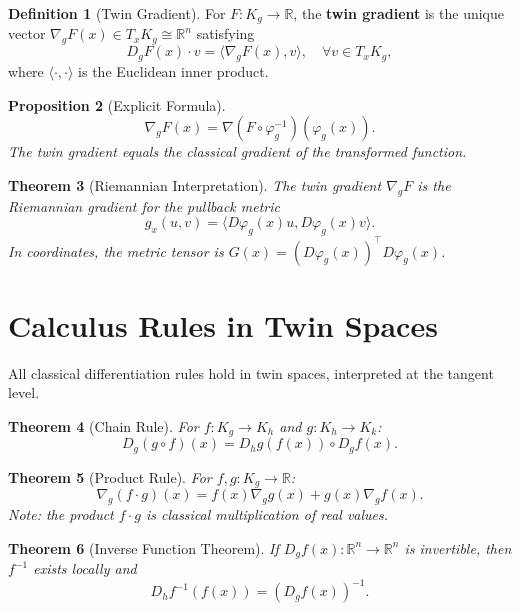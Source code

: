 \documentclass[11pt,twoside]{book}
\theoremstyle{plain}
\newtheorem{theorem}{Theorem}[chapter]
\newtheorem{proposition}[theorem]{Proposition}
\theoremstyle{definition}
\newtheorem{definition}[theorem]{Definition}
\theoremstyle{remark}
\newcommand{\R}{\mathbb{R}}
\newcommand{\Kg}{K_g}
\newcommand{\Dg}{D_g}
\newcommand{\nablg}{\nabla_g}
\begin{document}
\begin{definition}[Twin Gradient]
    \label{def:twin_gradient}
    For $F : \Kg \to \R$, the \textbf{twin gradient} is the unique vector $\nablg F(x) \in T_x \Kg \cong \R^n$ satisfying
    \[
    \Dg F(x) \cdot v = \langle \nablg F(x), v \rangle, \quad \forall v \in T_x \Kg,
    \]
    where $\langle \cdot, \cdot \rangle$ is the Euclidean inner product.
\end{definition}

\begin{proposition}[Explicit Formula]
    \label{prop:twin_grad_formula}
    \[
    \nablg F(x) = \nabla(F \circ \varphi_g^{-1})(\varphi_g(x)).
    \]
    The twin gradient equals the classical gradient of the transformed function.
\end{proposition}

\begin{theorem}[Riemannian Interpretation]
    \label{thm:riemannian}
    The twin gradient $\nablg F$ is the Riemannian gradient for the pullback metric
    \[
    g_x(u, v) = \langle D\varphi_g(x) u, D\varphi_g(x) v \rangle.
    \]
    In coordinates, the metric tensor is $G(x) = (D\varphi_g(x))^\top D\varphi_g(x)$.
\end{theorem}

\section{Calculus Rules in Twin Spaces}
\label{sec:calculus_rules}

All classical differentiation rules hold in twin spaces, interpreted at the tangent level.

\begin{theorem}[Chain Rule]
    \label{thm:chain_rule}
    For $f : \Kg \to K_h$ and $g : K_h \to K_k$:
    \[
    D_g(g \circ f)(x) = D_h g(f(x)) \circ \Dg f(x).
    \]
\end{theorem}

\begin{theorem}[Product Rule]
    For $f, g : \Kg \to \R$:
    \[
    \nablg(f \cdot g)(x) = f(x) \nablg g(x) + g(x) \nablg f(x).
    \]
    Note: the product $f \cdot g$ is classical multiplication of real values.
\end{theorem}

\begin{theorem}[Inverse Function Theorem]
    If $\Dg f(x) : \R^n \to \R^n$ is invertible, then $f^{-1}$ exists locally and
    \[
    D_h f^{-1}(f(x)) = (\Dg f(x))^{-1}.
    \]
\end{theorem}
\end{document}
